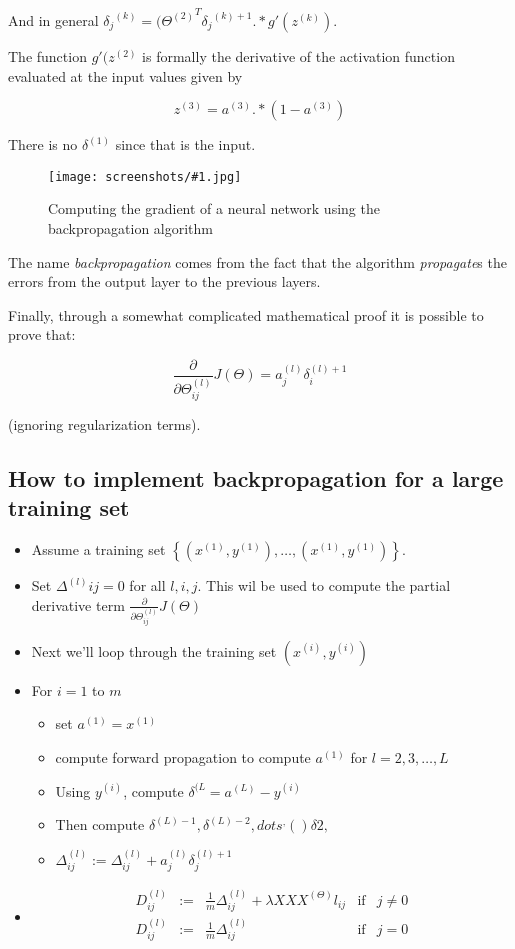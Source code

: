 \documentclass[a4, 12pt, english, USenglish]{scrreprt}
\newcommand{\screenshot}[2]{
\begin{figure}[htb]
\texttt{[image: screenshots/\#1.jpg]}
\label{#1}
\caption{#2}
\end{figure}}
\newcommand{\braces}[1]{\ensuremath{\left\{{#1}\right\}}}
\newcommand{\idx}[1]{{\em #1}\index{#1}}
\begin{document}
And in general   \({\delta_j}^{(k)} = ({{\Theta}^{(2)}}^T{\delta_j}^{(k)+1}  .*  g'({z}^{(k)}) \).
 
The function \(g'({z}^{(2)}\) is formally the derivative of the
  activation function evaluated at the input values given by

\[
  {z}^{(3)} =  {a}^{(3)} .* (1 - {a}^{(3)})
\]

There is no \({\delta}^{(1)}\) since that is the input.

\screenshot{NNbackpropcalculation}{Computing the gradient of a neural
  network using the backpropagation algorithm}

The name \idx{backpropagation} comes from the fact that the algorithm
\idx{propagate}s the errors from the output layer to the previous layers.


Finally, through a somewhat complicated mathematical proof it is
possible to prove that:

\[
  \frac{\partial}{\partial{\Theta^{(l)}_{ij}}} J(\Theta) = {a}^{(l)}_j{\delta}^{(l)+1}_i
\]

(ignoring regularization terms).

\subsection{How to implement backpropagation for a large training set}

\begin{itemize}

\item Assume a training set \(\braces{({x}^{(1)}, {y}^{(1)}), \ldots, ({x}^{(1)}, {y}^{(1)})}\).
\item Set \({\Delta}^{(l)}{ij} = 0\) for all \(l,i,j\).  This wil be
  used to compute the partial derivative term   \(\frac{\partial}{\partial{\Theta^{(l)}_{ij}}} J(\Theta)\)
\item Next we'll loop through the training set \(({x}^{(i)},  {y}^{(i)})\)
\item For \(i=1\) to \(m\)
\begin{itemize}
 \item set \({a}^{(1)}={x}^{(1)}\)
 \item compute forward propagation to compute \({a}^{(1)}\) for \(l =   2,3,\ldots,L\)
  \item Using  \({y}^{(i)}\), compute \({\delta}^{(L}={a}^{(L)} -{y}^{(i)}\)
 \item Then compute \({\delta}^{(L)-1}, {\delta}^{(L)-2}, dots^,( ){\delta}{2}, \)
 \item \({\Delta}^{(l)}_{ij} := {\Delta}^{(l)}_{ij} + {a}^{(l)}_j {\delta}^{(l)+1}_j \)
\end{itemize}
\item 
\[
\begin{array}{lclrr}
{D}^{(l)}_{ij}  &:=& \frac{1}{m} {\Delta}^{(l)}_{ij} +\lambda XXX^{(\Theta)}{l}_{ij} &\mbox{if}& j\neq 0\\
{D}^{(l)}_{ij}  &:=& \frac{1}{m} {\Delta}^{(l)}_{ij}    &\mbox{if}& j=0\\
\end{array}
\]
\end{itemize}
\end{document}
